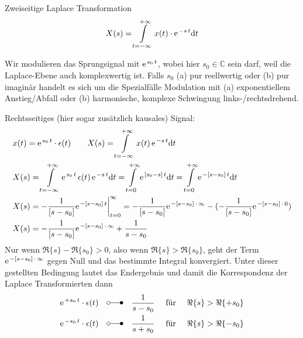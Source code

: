 \documentclass[11pt,a4paper,DIV=12]{scrartcl}
\numberwithin{equation}{section}
\numberwithin{figure}{section}
\newcommand\fsd{\mathrm{d}} %
\begin{document}
\begin{Werkzeug}
Zweiseitige Laplace Transformation
\begin{align}
X(s) = \int\limits_{t=-\infty}^{+\infty} x(t) \cdot \e^{-s\,t} \fsd t
\end{align}
\end{Werkzeug}
\begin{Ansatz}
Wir modulieren das Sprungsignal mit $\e^{s_0 \, t}$, wobei hier
$s_0 \in \mathbb{C}$ sein darf, weil die Laplace-Ebene auch komplexwertig ist.
Falls $s_0$ (a) pur reellwertig oder (b) pur imaginär handelt es sich um die
Spezialfälle Modulation mit (a) exponentiellem Anstieg/Abfall oder (b)
harmonische, komplexe Schwingung links-/rechtsdrehend.
\end{Ansatz}

\begin{ExCalc}
Rechtsseitiges (hier sogar zusätzlich kausales) Signal:
\begin{align}
&x(t) = \e^{s_0 \, t} \cdot \epsilon(t) \qquad
X(s) = \int\limits_{t = -\infty}^{+\infty} x(t) \, \e^{-s\,t}  \fsd t\\
&X(s) = \int\limits_{t = -\infty}^{+\infty} \e^{s_0 \, t} \, \epsilon(t) \, \e^{-s\,t}  \fsd t
= \int\limits_{t = 0}^{+\infty} \e^{[s_0-s]\,t} \fsd t = \int\limits_{t = 0}^{+\infty} \e^{-[s-s_0]\,t} \fsd t\\
&X(s) = -\frac{1}{[s-s_0]}\e^{-[s-s_0]\,t}\bigg|_{t=0}^{\infty}=
-\frac{1}{[s-s_0]}\e^{-[s-s_0]\,\cdot\,\infty }
-(-\frac{1}{[s-s_0]}\e^{-[s-s_0]\,\cdot\,0})\\
&X(s) = -\frac{1}{[s-s_0]}\e^{-[s-s_0]\,\cdot\,\infty }
+\frac{1}{s-s_0}
\end{align}
Nur wenn $\Re\{s\}-\Re\{s_0\} > 0$, also wenn $\Re\{s\}>\Re\{s_0\}$, geht
der Term $\e^{-[s-s_0]\,\cdot\,\infty }$ gegen Null und das bestimmte Integral
konvergiert.
Unter dieser gestellten Bedingung lautet das Endergebnis und damit die
Korrespondenz der Laplace Transformierten dann
\begin{align}
\e^{+s_0 \, t} \cdot \epsilon(t) \quad \laplace \quad \frac{1}{s-s_0} \quad\text{ für } \quad\Re\{s\} > \Re\{+s_0\}\\
\e^{-s_0 \, t} \cdot \epsilon(t) \quad \laplace \quad \frac{1}{s+s_0} \quad\text{ für } \quad\Re\{s\} > \Re\{-s_0\}
\end{align}


\end{ExCalc}
\end{document}
